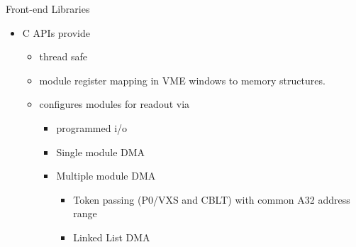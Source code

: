 Front-end Libraries
\begin{itemize}
\item C APIs provide
  \begin{itemize}
  \item thread safe
  \item module register mapping in VME windows to memory structures.
  \item configures modules for readout via
    \begin{itemize}
    \item programmed i/o
    \item Single module DMA
    \item Multiple module DMA
       \begin{itemize}
       \item Token passing (P0/VXS and CBLT) with common A32 address range
       \item Linked List DMA
       \end{itemize}
    \end{itemize}
  \end{itemize}
\end{itemize}
